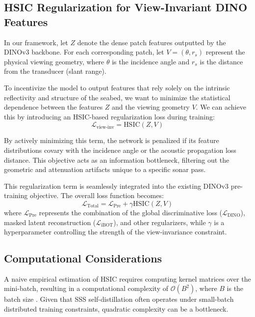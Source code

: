 \documentclass[12pt]{article}
\begin{document}
\subsection{HSIC Regularization for View-Invariant DINO Features}
In our framework, let $Z$ denote the dense patch features outputted by the DINOv3 backbone. For each corresponding patch, let $V = (\theta, r_s)$ represent the physical viewing geometry, where $\theta$ is the incidence angle and $r_s$ is the distance from the transducer (slant range). 

To incentivize the model to output features that rely solely on the intrinsic reflectivity and structure of the seabed, we want to minimize the statistical dependence between the features $Z$ and the viewing geometry $V$. We can achieve this by introducing an HSIC-based regularization loss during training:
\begin{equation}
\mathcal{L}_{\text{view-inv}} = \text{HSIC}(Z, V)
\end{equation}

By actively minimizing this term, the network is penalized if its feature distributions covary with the incidence angle or the acoustic propagation loss distance. This objective acts as an information bottleneck, filtering out the geometric and attenuation artifacts unique to a specific sonar pass.

This regularization term is seamlessly integrated into the existing DINOv3 pre-training objective. The overall loss function becomes:
\begin{equation}
\mathcal{L}_{\text{Total}} = \mathcal{L}_{\text{Pre}} + \gamma \text{HSIC}(Z, V)
\end{equation}
where $\mathcal{L}_{\text{Pre}}$ represents the combination of the global discriminative loss ($\mathcal{L}_{\text{DINO}}$), masked latent reconstruction ($\mathcal{L}_{\text{iBOT}}$), and other regularizers, while $\gamma$ is a hyperparameter controlling the strength of the view-invariance constraint.

\subsection{Computational Considerations}
A naive empirical estimation of HSIC requires computing kernel matrices over the mini-batch, resulting in a computational complexity of $\mathcal{O}(B^2)$, where $B$ is the batch size \cite{HSIC_SSL}. Given that SSS self-distillation often operates under small-batch distributed training constraints, quadratic complexity can be a bottleneck. 
\end{document}
